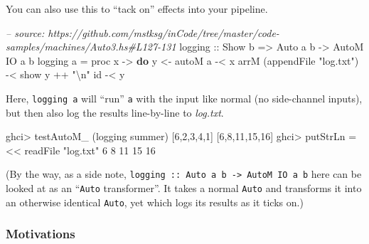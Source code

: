 \documentclass[]{article}
\newenvironment{Shaded}{}{}
\newcommand{\KeywordTok}[1]{\textcolor[rgb]{0.00,0.44,0.13}{\textbf{{#1}}}}
\newcommand{\DataTypeTok}[1]{\textcolor[rgb]{0.56,0.13,0.00}{{#1}}}
\newcommand{\DecValTok}[1]{\textcolor[rgb]{0.25,0.63,0.44}{{#1}}}
\newcommand{\StringTok}[1]{\textcolor[rgb]{0.25,0.44,0.63}{{#1}}}
\newcommand{\CommentTok}[1]{\textcolor[rgb]{0.38,0.63,0.69}{\textit{{#1}}}}
\newcommand{\OtherTok}[1]{\textcolor[rgb]{0.00,0.44,0.13}{{#1}}}
\newcommand{\FunctionTok}[1]{\textcolor[rgb]{0.02,0.16,0.49}{{#1}}}
\newcommand{\NormalTok}[1]{{#1}}
\begin{document}
You can also use this to ``tack on'' effects into your pipeline.

\begin{Shaded}
\begin{Highlighting}[]
\CommentTok{-- source: https://github.com/mstksg/inCode/tree/master/code-samples/machines/Auto3.hs#L127-131}
\OtherTok{logging ::} \DataTypeTok{Show} \NormalTok{b }\OtherTok{=>} \DataTypeTok{Auto} \NormalTok{a b }\OtherTok{->} \DataTypeTok{AutoM} \DataTypeTok{IO} \NormalTok{a b}
\NormalTok{logging a }\FunctionTok{=} \NormalTok{proc x }\OtherTok{->} \KeywordTok{do}
    \NormalTok{y }\OtherTok{<-} \NormalTok{autoM a }\FunctionTok{-<} \NormalTok{x}
    \NormalTok{arrM (appendFile }\StringTok{"log.txt"}\NormalTok{) }\FunctionTok{-<} \NormalTok{show y }\FunctionTok{++} \StringTok{"\textbackslash{}n"}
    \NormalTok{id }\FunctionTok{-<} \NormalTok{y}
\end{Highlighting}
\end{Shaded}

Here, \texttt{logging\ a} will ``run'' \texttt{a} with the input like
normal (no side-channel inputs), but then also log the results
line-by-line to \emph{log.txt}.

\begin{Shaded}
\begin{Highlighting}[]
\NormalTok{ghci}\FunctionTok{>} \NormalTok{testAutoM_ (logging summer) [}\DecValTok{6}\NormalTok{,}\DecValTok{2}\NormalTok{,}\DecValTok{3}\NormalTok{,}\DecValTok{4}\NormalTok{,}\DecValTok{1}\NormalTok{]}
\NormalTok{[}\DecValTok{6}\NormalTok{,}\DecValTok{8}\NormalTok{,}\DecValTok{11}\NormalTok{,}\DecValTok{15}\NormalTok{,}\DecValTok{16}\NormalTok{]}
\NormalTok{ghci}\FunctionTok{>} \NormalTok{putStrLn }\FunctionTok{=<<} \NormalTok{readFile }\StringTok{"log.txt"}
\DecValTok{6}
\DecValTok{8}
\DecValTok{11}
\DecValTok{15}
\DecValTok{16}
\end{Highlighting}
\end{Shaded}

(By the way, as a side note,
\texttt{logging\ ::\ Auto\ a\ b\ -\textgreater{}\ AutoM\ IO\ a\ b} here
can be looked at as an ``\texttt{Auto} transformer''. It takes a normal
\texttt{Auto} and transforms it into an otherwise identical
\texttt{Auto}, yet which logs its results as it ticks on.)

\subsubsection{Motivations}\label{motivations}
\end{document}
